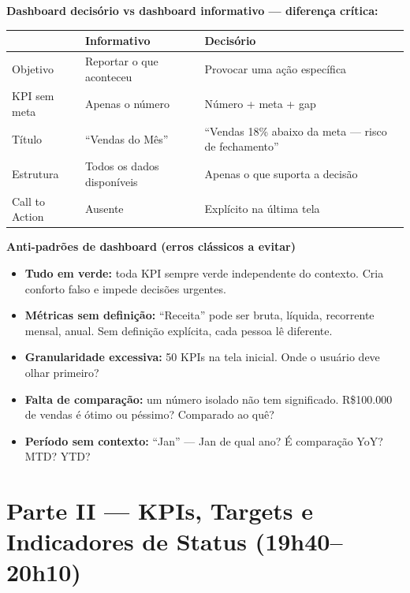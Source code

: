 \begin{SolvedBox}
\textbf{Dashboard decisório vs dashboard informativo — diferença crítica:}

\begin{tabular}{|l|p{6cm}|p{5.5cm}|}
\hline
& \textbf{Informativo} & \textbf{Decisório} \\
\hline
Objetivo & Reportar o que aconteceu & Provocar uma ação específica \\
KPI sem meta & Apenas o número & Número + meta + gap \\
Título & ``Vendas do Mês'' & ``Vendas 18\% abaixo da meta — risco de fechamento'' \\
Estrutura & Todos os dados disponíveis & Apenas o que suporta a decisão \\
Call to Action & Ausente & Explícito na última tela \\
\hline
\end{tabular}
\end{SolvedBox}

\begin{BoardBox}
\textbf{Anti-padrões de dashboard (erros clássicos a evitar)}
\begin{itemize}
  \item \textbf{Tudo em verde:} toda KPI sempre verde independente do contexto.
  Cria conforto falso e impede decisões urgentes.
  \item \textbf{Métricas sem definição:} ``Receita'' pode ser bruta, líquida,
  recorrente mensal, anual. Sem definição explícita, cada pessoa lê diferente.
  \item \textbf{Granularidade excessiva:} 50 KPIs na tela inicial. Onde o usuário
  deve olhar primeiro?
  \item \textbf{Falta de comparação:} um número isolado não tem significado.
  R\$100.000 de vendas é ótimo ou péssimo? Comparado ao quê?
  \item \textbf{Período sem contexto:} ``Jan'' — Jan de qual ano? É comparação YoY?
  MTD? YTD?
\end{itemize}
\end{BoardBox}

\section{Parte II — KPIs, Targets e Indicadores de Status (19h40–20h10)}

